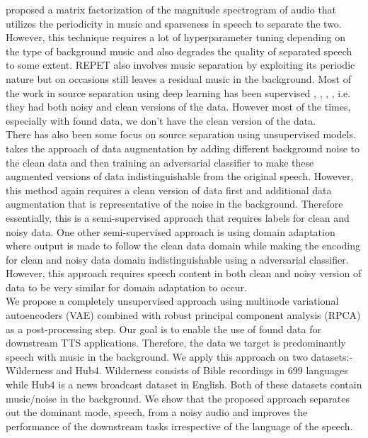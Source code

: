 \cite{6287816} proposed a matrix factorization of the magnitude spectrogram of audio that utilizes the periodicity in music and sparseness in speech to separate the two. However, this technique requires a lot of hyperparameter tuning depending on the type of background music and also degrades the quality of separated speech to some extent. REPET \cite{6269059} also involves music separation by exploiting its periodic nature but on occasions still leaves a residual music in the background. Most of the work in source separation using deep learning has been supervised \cite{SVSGAN}, \cite{Disc}, \cite{TFGAN}, \cite{spen}, i.e. they had both noisy and clean versions of the data. However most of the times, especially with found data, we don't have the clean version of the data. \\

There has also been some focus on source separation using unsupervised models. \cite{Hsu2018DisentanglingCS} takes the approach of data augmentation by adding different background noise to the clean data and then training an adversarial classifier to make these augmented versions of data indistinguishable from the original speech. However, this method again requires a clean version of data first and additional data augmentation that is representative of the noise in the background. Therefore essentially, this is a semi-supervised approach that requires labels for clean and noisy data. One other semi-supervised approach is using domain adaptation \cite{domadp} where output is made to follow the clean data domain while making the encoding for clean and noisy data domain indistinguishable using a adversarial classifier. However, this approach requires speech content in both clean and noisy version of data to be very similar for domain adaptation to occur. \\

We propose a completely unsupervised approach using multinode variational autoencoders (VAE) combined with robust principal component analysis (RPCA) \cite{6287816} as a post-processing step. Our goal is to enable the use of found data for downstream TTS applications. Therefore, the data we target is predominantly speech with music in the background. We apply this approach on two datasets:- Wilderness\cite{wildernessdataset} and Hub4. Wilderness consists of Bible recordings in 699 languages while Hub4 is a news broadcast dataset in English. Both of these datasets contain music/noise in the background. We show that the proposed approach separates out the dominant mode, speech, from a noisy audio and improves the performance of the downstream tasks irrespective of the language of the speech. \\

